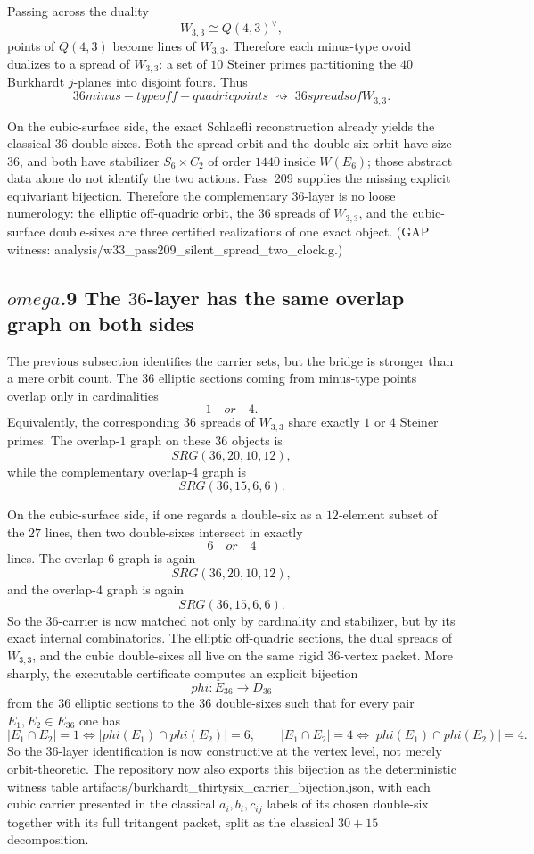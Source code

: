 \documentclass[12pt,a4paper]{article}
\def\mathrm#1{#1}%
\def\mathcal#1{#1}%
\def\texttt#1{#1}%
\def\text#1{#1}%
\def\omega{omega}%
\def\phi{phi}%
\theoremstyle{definition}
\newcommand{\SRG}{\mathrm{SRG}}
\begin{document}
Passing across the duality
\[
W_{3,3} \cong Q(4,3)^{\vee},
\]
points of $Q(4,3)$ become lines of $W_{3,3}$.  Therefore each minus-type ovoid
dualizes to a spread of $W_{3,3}$: a set of $10$ Steiner primes partitioning
the $40$ Burkhardt $j$-planes into disjoint fours.  Thus
\[
\boxed{\;36 \text{ minus-type off-quadric points}
\;\rightsquigarrow
\;36 \text{ spreads of } W_{3,3}.\;}
\]

On the cubic-surface side, the exact Schlaefli reconstruction already yields
the classical $36$ double-sixes.  Both the spread orbit and the double-six
orbit have size $36$, and both have stabilizer $S_6\times C_2$ of order
$1440$ inside $W(E_6)$; those abstract data alone do not identify the two
actions.  Pass~209 supplies the missing explicit equivariant bijection.
Therefore the complementary $36$-layer is no loose numerology: the elliptic
off-quadric orbit, the $36$ spreads of $W_{3,3}$, and the cubic-surface
double-sixes are three certified realizations of one exact object.  (GAP
witness: \texttt{analysis/w33\_pass209\_silent\_spread\_two\_clock.g}.)

\subsection*{$\omega$.9 \quad The $36$-layer has the same overlap graph on both sides}
The previous subsection identifies the carrier sets, but the bridge is stronger
than a mere orbit count.  The $36$ elliptic sections coming from minus-type
points overlap only in cardinalities
\[
1 \quad \text{or} \quad 4.
\]
Equivalently, the corresponding $36$ spreads of $W_{3,3}$ share exactly $1$ or
$4$ Steiner primes.  The overlap-$1$ graph on these $36$ objects is
\[
\boxed{\;\SRG(36,20,10,12),\;}
\]
while the complementary overlap-$4$ graph is
\[
\boxed{\;\SRG(36,15,6,6).\;}
\]

On the cubic-surface side, if one regards a double-six as a $12$-element subset
of the $27$ lines, then two double-sixes intersect in exactly
\[
6 \quad \text{or} \quad 4
\]
lines.  The overlap-$6$ graph is again
\[
\boxed{\;\SRG(36,20,10,12),\;}
\]
and the overlap-$4$ graph is again
\[
\boxed{\;\SRG(36,15,6,6).\;}
\]
So the $36$-carrier is now matched not only by cardinality and stabilizer, but
by its exact internal combinatorics.  The elliptic off-quadric sections, the
dual spreads of $W_{3,3}$, and the cubic double-sixes all live on the same
rigid $36$-vertex packet.  More sharply, the executable certificate computes an
explicit bijection
\[
\phi:\mathcal E_{36}\longrightarrow \mathcal D_{36}
\]
from the $36$ elliptic sections to the $36$ double-sixes such that for every
pair $E_1,E_2\in \mathcal E_{36}$ one has
\[
|E_1\cap E_2| = 1 \iff |\phi(E_1)\cap \phi(E_2)| = 6,
\qquad
|E_1\cap E_2| = 4 \iff |\phi(E_1)\cap \phi(E_2)| = 4.
\]
So the $36$-layer identification is now constructive at the vertex level, not
merely orbit-theoretic.  The repository now also exports this bijection as the
deterministic witness table \texttt{artifacts/burkhardt\_thirtysix\_carrier\_bijection.json},
with each cubic carrier presented in the classical $a_i,b_i,c_{ij}$ labels of
its chosen double-six together with its full tritangent packet, split as the
classical $30+15$ decomposition.
\end{document}

